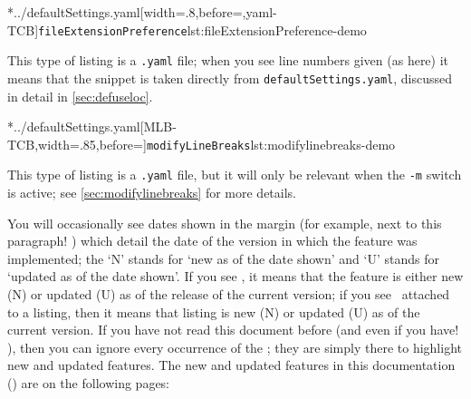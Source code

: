 	\begin{minipage}{.4\textwidth}
		\cmhlistingsfromfile[style=fileExtensionPreference]*{../defaultSettings.yaml}[width=.8\linewidth,before=\centering,yaml-TCB]{\texttt{fileExtensionPreference}}{lst:fileExtensionPreference-demo}
	\end{minipage}%
	\hfill
	\begin{minipage}{.4\textwidth}
		This type of listing is a \texttt{.yaml} file; when you see line numbers given (as here) it means that the snippet is taken directly from \texttt{defaultSettings.yaml}, discussed in detail in \vref{sec:defuseloc}.
	\end{minipage}%

	\begin{minipage}{.55\textwidth}
		\cmhlistingsfromfile[style=modifylinebreaks]*{../defaultSettings.yaml}[MLB-TCB,width=.85\linewidth,before=\centering]{\texttt{modifyLineBreaks}}{lst:modifylinebreaks-demo}
	\end{minipage}%
	\hfill
	\begin{minipage}{.4\textwidth}
		This type of listing is a \texttt{.yaml} file, but it will only be relevant when the \texttt{-m} switch is active; see \vref{sec:modifylinebreaks} for more details.
	\end{minipage}%

	You will occasionally see dates shown in the margin (for example, next to this paragraph!
	)
	 which detail the date of the version in which the feature was implemented;
	the `N' stands for `new as of the date shown' and `U' stands for `updated as of the date shown'.
	If you see \stardemo, it means that the feature is either new (N) or updated (U) as of the release of the current version; if you see \stardemo\, attached to a listing, then it means that listing is new (N) or updated (U) as of the current version.
	If you have not read this document before (and even if you have!
	), then you can ignore every occurrence of the \stardemo;
	they are simply there to highlight new and updated features.
	The new and updated features in this documentation (\gitRel) are on the following pages: \listOfNewFeatures 


